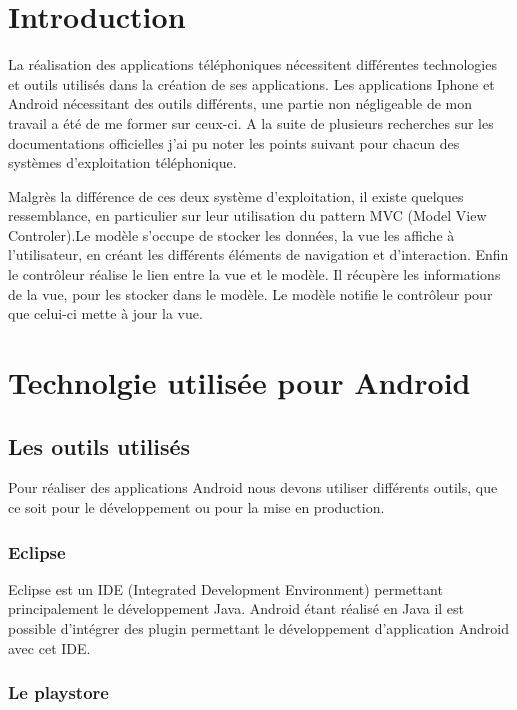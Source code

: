 \section{Introduction}

La réalisation des applications téléphoniques nécessitent différentes technologies et outils utilisés dans la création de ses applications. Les applications Iphone et Android nécessitant des outils différents, une partie non négligeable de mon travail a été de me former sur ceux-ci. A la suite de plusieurs recherches sur les documentations officielles j'ai pu noter les points suivant pour chacun des systèmes d'exploitation téléphonique.

Malgrès la différence de ces deux système d'exploitation, il existe quelques ressemblance, en particulier sur leur utilisation du pattern MVC (Model View Controler).Le modèle s’occupe de stocker les données, la vue les affiche à l’utilisateur, en créant les différents éléments de navigation et d'interaction. Enfin le contrôleur réalise le lien entre la vue et le modèle. Il récupère les informations de la vue, pour les stocker dans le modèle. Le modèle notifie le contrôleur pour que celui-ci mette à jour la vue.

\section{Technolgie utilisée pour Android}

\subsection{Les outils utilisés}

Pour réaliser des applications Android nous devons utiliser différents outils, que ce soit pour le développement ou pour la mise en production.

\subsubsection{Eclipse}

Eclipse est un IDE (Integrated Development Environment) permettant principalement le développement Java. Android étant réalisé en Java il est possible d'intégrer des plugin permettant le développement d'application Android avec cet IDE.

\subsubsection{Le playstore}

